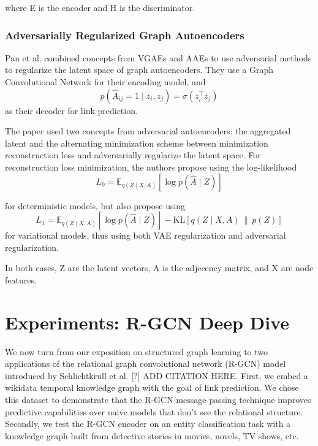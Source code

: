 \documentclass[11pt]{article}
\theoremstyle{definition}
\begin{document}
where E is the encoder and H is the discriminator.


\subsubsection{Adversarially Regularized Graph Autoencoders}
Pan et al. combined concepts from VGAEs and AAEs to use adversarial methods to regularize the latent space of graph autoencoders. They use a Graph Convolutional Network for their encoding model, and 
\[
p\!\left(\hat{A}_{ij}=1 \mid z_i, z_j\right)
=
\sigma\!\left(z_i^\top z_j\right)
\]
as their decoder for link prediction.

The paper used two concepts from adversarial autoencoders: the aggregated latent and the alternating minimization scheme between minimization reconstruction loss and adversarially regularize the latent space. For reconstruction loss minimization, the authors propose using the log-likelihood
\[
L_0
=
\mathbb{E}_{q(Z \mid X,A)}
\left[
\log p(\hat{A}\mid Z)
\right]
\]

for deterministic models, but also propose using
\[
L_1
=
\mathbb{E}_{q(Z \mid X,A)}
\left[
\log p(\hat{A}\mid Z)
\right]
-
\mathrm{KL}
\left[
q(Z\mid X,A)
\,\|\, 
p(Z)
\right]
\]
for variational models, thus using both VAE regularization and adversarial regularization.

In both cases, Z are the latent vectors, A is the adjecency matrix, and X are node features.


\section{Experiments: R-GCN Deep Dive}
\label{sec:experiments}

We now turn from our exposition on structured graph learning to two applications of the relational graph convolutional network (R-GCN) model introduced by Schlichtkrull et al. [?] ADD CITATION HERE. First, we embed a wikidata temporal knowledge graph with the goal of link prediction. We chose this dataset to demonstrate that the R-GCN message passing technique improves predictive capabilities over naive models that don't see the relational structure. Secondly, we test the R-GCN encoder on an entity classification task with a knowledge graph built from detective stories in movies, novels, TV shows, etc. 



\end{document}
